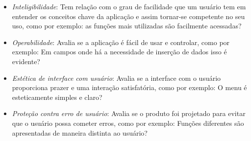 \begin{itemize}
    \begin{itemize}
        \item \textit{Inteligibilidade}: Tem relação com o grau de facilidade que um usuário tem em entender os conceitos chave da aplicação e assim tornar-se competente no seu uso, como por exemplo: as funções mais utilizadas são facilmente acessadas?
        \item \textit{Operabilidade}: Avalia se a aplicação é fácil de usar e controlar, como por exemplo: Em campos onde há a necessidade de inserção de dados isso é evidente?
        \item \textit{Estética de interface com usuário}: Avalia se a interface com o usuário proporciona prazer e uma interação satisfatória, como por exemplo: O menu é esteticamente simples e claro?
        \item \textit{Proteção contra erro de usuário}: Avalia se o produto foi projetado para evitar que o usuário possa cometer erros, como por exemplo: Funções diferentes são apresentadas de maneira distinta ao usuário?
    \end{itemize}
\end{itemize}

